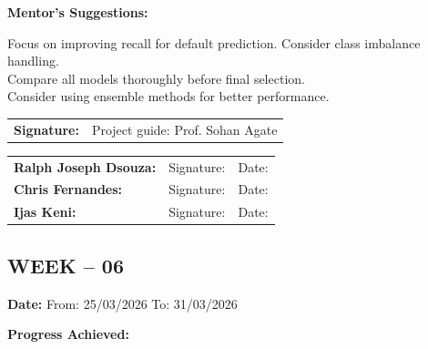 \documentclass[12pt,a4paper]{article}
\begin{document}
\medskip

\noindent\textbf{Mentor's Suggestions:}

\medskip

\noindent Focus on improving recall for default prediction. Consider class imbalance handling. \\
Compare all models thoroughly before final selection. \\
Consider using ensemble methods for better performance.

\medskip

\noindent\begin{tabular}{p{4cm} p{6cm}}
\textbf{Signature:} & Project guide: Prof. Sohan Agate \\
\end{tabular}

\medskip

\noindent\begin{tabular}{p{3.5cm} p{5cm} p{3cm}}
\textbf{Ralph Joseph Dsouza:} & Signature: \underline{\hspace{4cm}} & Date: \underline{\hspace{2cm}} \\
\textbf{Chris Fernandes:} & Signature: \underline{\hspace{4cm}} & Date: \underline{\hspace{2cm}} \\
\textbf{Ijas Keni:} & Signature: \underline{\hspace{4cm}} & Date: \underline{\hspace{2cm}} \\
\end{tabular}

\newpage

\subsection*{WEEK – 06}
\vspace{0.3cm}

\textbf{Date:} From: 25/03/2026 To: 31/03/2026

\medskip

\noindent\textbf{Progress Achieved:}

\medskip
\end{document}
